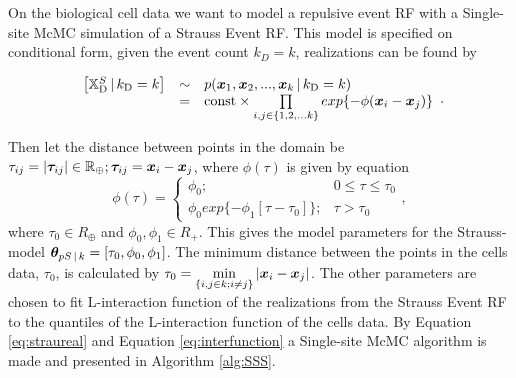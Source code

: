 \section{}
\label{sec:problem4}

On the biological cell data we want to model a repulsive event RF with a Single-site McMC simulation of a Strauss Event RF. This model is specified on conditional form, given the event count $k_D = k$, realizations can be found by
%

\begin{equation}
    \begin{array}{rcl}
        \left[\mathbb{X}_\textrm{D}^S \, | \, k_\textrm{D} = k\right] & \sim & p(\bm{x}_1,\bm{x}_2,...,\bm{x}_k \, | \, k_\textrm{D} = k) \\
         & = & \mathrm{const} \times \prod\limits_{i,j\in \{1,2,...k\}} exp\{-\phi(\bm{x}_i-\bm{x}_j)\}
    \end{array}.
    \label{eq:straureal}
\end{equation}
%

Then let the distance between points in the domain be $\tau_{ij} = |\bm{\tau}_{ij}| \in \mathbb{R}_\oplus; \bm{\tau}_{ij} = \bm{x}_i - \bm{x}_j$, where $\phi(\tau)$ is given by equation 
\begin{equation}
    \phi(\tau) = \begin{cases}
                    \phi_0; & 0 \leq \tau \leq \tau_0\\
                    \phi_0 exp\{-\phi_1[\tau-\tau_0]\}; & \tau > \tau_0
                \end{cases},
    \label{eq:interfunction}
\end{equation}
where $\tau_0 \in R_\oplus$ and $\phi_0,\phi_1 \in R_+$. This gives the model parameters for the Strauss-model $\bm{\theta} _{pS\, | \, k} = [\tau_0,\phi_0,\phi_1]$. The minimum distance between the points in the cells data, $\tau_0$, is calculated by $\tau_0 = \min\limits_{\{i,j\in k;i\neq j\}} |\bm{x}_i-\bm{x}_j|$. The other parameters are chosen to fit L-interaction function of the realizations from the Strauss Event RF to the quantiles of the L-interaction function of the cells data. By Equation \eqref{eq:straureal} and Equation \eqref{eq:interfunction} a Single-site McMC algorithm is made and presented in Algorithm \ref{alg:SSS}. 

